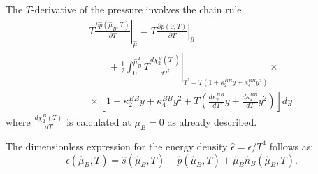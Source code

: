 \documentclass[aps,prd,twocolumn,superscriptaddress]{revtex4-2}
\newcommand \hmu {\hat{\mu}}
\begin{document}
The $T$-derivative of the pressure involves the chain rule
\begin{align}
& \quad T  \left. \frac{\partial \hat{p}(\hmu_B,T)}{\partial T} \right|_{\hmu} = T  \left. \frac{\partial \hat{p}(0,T)}{\partial T} \right|_{\hmu}  \\
& \quad \qquad + \frac12 \int_0^{\hmu_B^2} T \left.\frac{d \chi^B_2(T^\prime)}{dT^\prime}\right|_{T^\prime = T\left( 1+\kappa_2^{BB} y + \kappa_4^{BB}y^2 \right)} \times \nonumber \\
& \quad \times \left[ 1+\kappa_2^{BB}y +\kappa_4^{BB}y^2 + T \left( \frac{d\kappa_2^{BB}}{dT} y+\frac{d\kappa_4^{BB}}{dT}y^2 \right) \right] dy \nonumber
\end{align}
where $\frac{d \chi^B_2(T)}{dT}$ is calculated at $\mu_B=0$ as already described.

The dimensionless expression for the energy density $\hat \epsilon= \epsilon/T^4$ follows as:
\begin{equation}
\hat{\epsilon}(\hmu_B,T) = \hat{s}(\hmu_B,T) - \hat{p}(\hmu_B,T) + 
											\hmu_B \hat{n}_B(\hmu_B,T).
\end{equation}




%
\end{document}
